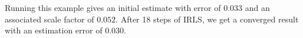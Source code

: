 Running this example gives an initial estimate with error of
$0.033$ and an associated scale factor of
$0.052$.  
After 18 steps of IRLS,
we get a converged result with an estimation error of
$0.030$.
